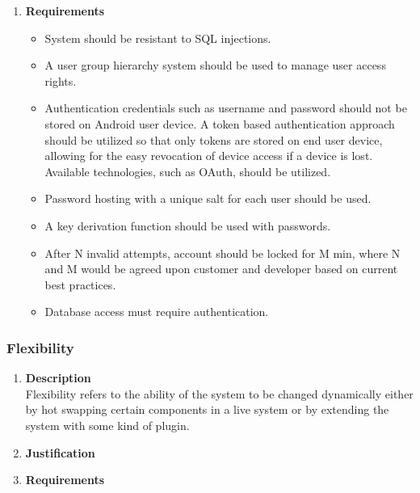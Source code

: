 \documentclass[a4paper,10pt]{article}
\begin{document}
\begin{enumerate}
			\item \textbf{Requirements}\\
				\begin{itemize}
					\item System should be resistant to SQL injections.
					\item A user group hierarchy system should be used to manage user access rights.
					\item Authentication credentials such as username and password should not be stored on Android user device. A token based authentication approach should be utilized so that only tokens are stored on end user device, allowing for the easy revocation of device access if a device is lost. Available technologies, such as OAuth, should be utilized.
					\item Password hosting with a unique salt for each user should be used.
					\item A key derivation function should be used with passwords. 
					\item After N invalid attempts, account should be locked for M min, where N and M would be agreed upon customer and developer based on current best practices.
					\item Database access must require authentication.
				\end{itemize}
		\end{enumerate}

	\subsubsection{Flexibility}
		\begin{enumerate}
			\item \textbf{Description} \\
				Flexibility refers to the ability of the system to be changed dynamically either by hot swapping certain components in a live system or by extending the system with some kind of plugin. 

			\item \textbf{Justification} \\
			\item \textbf{Requirements}\\
		\end{enumerate}
\end{document}
